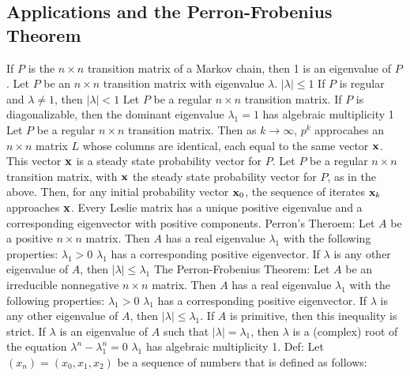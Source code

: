 \documentclass{article}
\begin{document}
        \subsection{Applications and the Perron-Frobenius Theorem}
        \begin{outline}
            \1 If \(P\) is the \(n\times n\) transition matrix of a Markov chain, then 1 is an eigenvalue of $P$. 
            \1 Let \(P\) be an \(n\times n\) transition matrix with eigenvalue \(\lambda\). 
                \2 \(|\lambda|\leq 1\) 
                \2 If $P$ is regular and \(\lambda\neq 1\), then \(|\lambda|<1\)
            \1 Let $P$ be a regular \(n\times n\) transition matrix. If $P$ is diagonalizable, then the dominant eigenvalue \(\lambda_1=1\) has algebraic multiplicity 1
            \1 Let $P$ be a regular \(n\times n\) transition matrix. Then as \(k\to \infty\), \(p^k\) approcahes an \(n\times n\) matrix $L$ whose columns are identical, each equal to the same vector \(\vb x\). This vector \(\vb x\) is a steady state probability vector for $P$. 
            \1 Let $P$ be a regular \(n\times n\) transition matrix, with \(\vb x\) the steady state probability vector for $P$, as in the above. Then, for any initial probability vector \(\vb x_0\), the sequence of iterates \(\vb x_k\) approaches \(\vb x\). 
            \1 Every Leslie matrix has a unique positive eigenvalue and a corresponding eigenvector with positive components. 
            \1 Perron's Theroem: Let $A$ be a positive \(n\times n\) matrix. Then \(A\) has a real eigenvalue \(\lambda_1\) with the following properties: 
                \2 \(\lambda_1>0\)
                \2 \(\lambda_1\) has a corresponding positive eigenvector. 
                \2 If \(\lambda\) is any other eigenvalue of $A$, then \(|\lambda|\leq\lambda_1\)
            \1 The Perron-Frobenius Theorem: Let \(A\) be an irreducible nonnegative \(n\times n\) matrix. Then \(A\) has a real eigenvalue \(\lambda_1\) with the following properties: 
                \2 \(\lambda_1>0\)
                \2 \(\lambda_1\) has a corresponding positive eigenvector. 
                \2 If \(\lambda\) is any other eigenvalue of $A$, then \(|\lambda|\leq\lambda_1\). If $A$ is primitive, then this inequality is strict. 
                \2 If \(\lambda\) is an eigenvalue of $A$ such that \(|\lambda|=\lambda_1\), then \(\lambda\) is a (complex) root of the equation \(\lambda^n-\lambda_1^n=0\)
                \2 \(\lambda_1\) has algebraic multiplicity 1. 
            \1 Def: Let \((x_n)=(x_0,x_1,x_2)\) be a sequence of numbers that is defined as follows: 

\end{outline}
\end{document}
